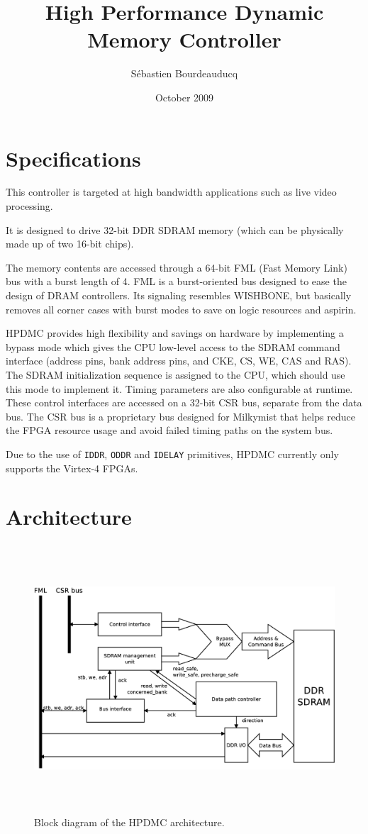 \documentclass[a4paper,11pt]{article}
\title{High Performance Dynamic Memory Controller}
\author{S\'ebastien Bourdeauducq}
\date{October 2009}
\begin{document}
\setlength{\parindent}{0pt}
\setlength{\parskip}{5pt}
\maketitle{}
\section{Specifications}
This controller is targeted at high bandwidth applications such as live video processing.

It is designed to drive 32-bit DDR SDRAM memory (which can be physically made up of two 16-bit chips).

The memory contents are accessed through a 64-bit FML (Fast Memory Link) bus with a burst length of 4. FML is a burst-oriented bus designed to ease the design of DRAM controllers. Its signaling resembles WISHBONE, but basically removes all corner cases with burst modes to save on logic resources and aspirin.

HPDMC provides high flexibility and savings on hardware by implementing a bypass mode which gives the CPU low-level access to the SDRAM command interface (address pins, bank address pins, and CKE, CS, WE, CAS and RAS). The SDRAM initialization sequence is assigned to the CPU, which should use this mode to implement it. Timing parameters are also configurable at runtime. These control interfaces are accessed on a 32-bit CSR bus, separate from the data bus. The CSR bus is a proprietary bus designed for Milkymist that helps reduce the FPGA resource usage and avoid failed timing paths on the system bus.

Due to the use of \verb!IDDR!, \verb!ODDR! and \verb!IDELAY! primitives, HPDMC currently only supports the Virtex-4 FPGAs.

\section{Architecture}

\begin{figure}[H]
\centering
\includegraphics[height=100mm]{blockdiagram.eps}
\caption{Block diagram of the HPDMC architecture.}\label{fig:blockdiagram}
\end{figure}
\end{document}

